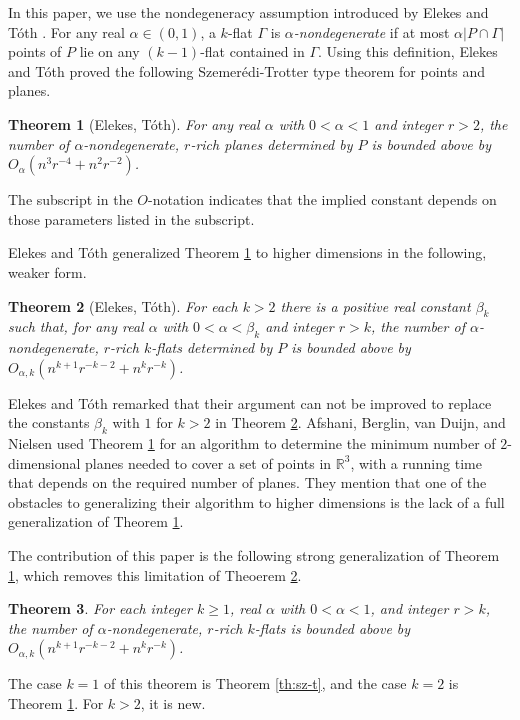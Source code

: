 \documentclass{article}
\newtheorem{theorem}{Theorem}
\begin{document}
In this paper, we use the nondegeneracy assumption introduced by Elekes and T\'oth \cite{elekes2005incidences}.
For any real $\alpha \in (0,1)$, a $k$-flat $\Gamma$ is {\em $\alpha$-nondegenerate} if at most $\alpha |P \cap \Gamma|$ points of $P$ lie on any $(k-1)$-flat contained in $\Gamma$.
Using this definition, Elekes and T\'oth proved the following Szemer\'edi-Trotter type theorem for points and planes.
\begin{theorem}[Elekes, T\'oth]\label{th:et-2}
For any real $\alpha$ with $0 < \alpha < 1$ and integer $r > 2$, the number of $\alpha$-nondegenerate, $r$-rich planes determined by $P$ is bounded above by $O_\alpha(n^3r^{-4} + n^2 r^{-2})$.
\end{theorem}
The subscript in the $O$-notation indicates that the implied constant depends on those parameters listed in the subscript.

Elekes and T\'oth generalized Theorem \ref{th:et-2} to higher dimensions in the following, weaker form.
\begin{theorem}[Elekes, T\'oth]\label{th:et-k}
For each $k > 2$ there is a positive real constant $\beta_k$ such that, for any real $\alpha$ with $0 < \alpha < \beta_k$ and integer $r > k$, the number of $\alpha$-nondegenerate, $r$-rich $k$-flats determined by $P$ is bounded above by $O_{\alpha, k}(n^{k+1} r^{-k-2} + n^k r^{-k})$.
\end{theorem}

Elekes and T\'oth remarked that their argument can not be improved to replace the constants $\beta_k$ with $1$ for $k>2$ in Theorem \ref{th:et-k}.
Afshani, Berglin, van Duijn, and Nielsen \cite{afshani2016applications} used Theorem \ref{th:et-2} for an algorithm to determine the minimum number of $2$-dimensional planes needed to cover a set of points in $\mathbb{R}^3$, with a running time that depends on the required number of planes.
They mention that one of the obstacles to generalizing their algorithm to higher dimensions is the lack of a full generalization of Theorem \ref{th:et-2}.

The contribution of this paper is the following strong generalization of Theorem \ref{th:et-2}, which removes this limitation of Theoerem \ref{th:et-k}.

\begin{theorem}\label{th:et-gen}
For each integer $k \geq 1$, real $\alpha$ with $0 < \alpha < 1$, and integer $r > k$, the number of $\alpha$-nondegenerate, $r$-rich $k$-flats is bounded above by $O_{\alpha, k}(n^{k+1} r^{-k-2} + n^k r^{-k})$.
\end{theorem}
The case $k=1$ of this theorem is Theorem \ref{th:sz-t}, and the case $k=2$ is Theorem \ref{th:et-2}.
For $k>2$, it is new.
\end{document}

